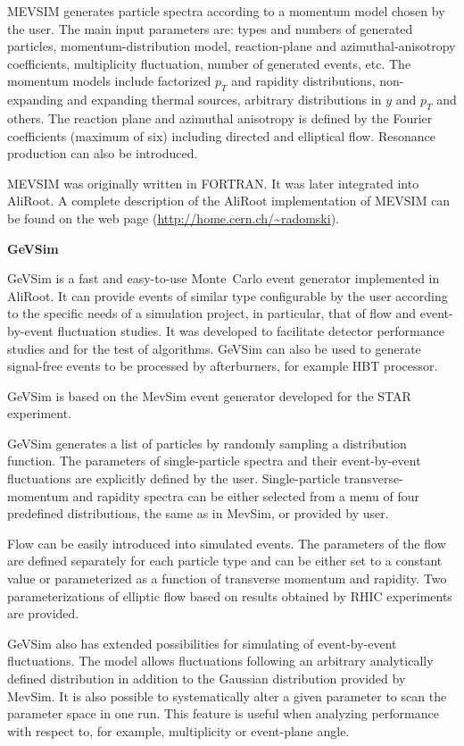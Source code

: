 \documentclass[12pt,a4paper,twoside]{article}
\makeatletter
\newcommand {\MC} {Monte~Carlo\@\xspace}
\makeatother
\begin{document}
MEVSIM generates particle spectra according to a momentum model
chosen by the user. The main input parameters are: types and
numbers of generated particles, momentum-distribution model,
reaction-plane and azimuthal-anisotropy coefficients, multiplicity
fluctuation, number of generated events, etc. The momentum models
include factorized $p_T$ and rapidity distributions, non-expanding
and expanding thermal sources, arbitrary distributions in $y$ and
$p_T$ and others. The reaction plane and azimuthal anisotropy is
defined by the Fourier coefficients (maximum of six) including
directed and elliptical flow. Resonance production can also be
introduced.

MEVSIM was originally written in FORTRAN. It was later integrated into
AliRoot. A complete description of the AliRoot implementation of MEVSIM can
be found on the web page (\url{http://home.cern.ch/~radomski}).

\textbf{GeVSim}

GeVSim \cite{MC:GEVSIM} is a fast and easy-to-use \MC
event generator implemented in AliRoot. It can provide events of
similar type configurable by the user according to the specific
needs of a simulation project, in particular, that of flow and
event-by-event fluctuation studies. It was developed to facilitate
detector performance studies and for the test of algorithms.
GeVSim can also be used to generate signal-free events to be
processed by afterburners, for example HBT processor.

GeVSim is based on the MevSim \cite{MC:MEVSIM} event generator
developed for the STAR experiment. 

GeVSim generates a list of particles by randomly sampling a
distribution function.  The parameters of single-particle spectra
and their event-by-event fluctuations are explicitly defined by
the user. Single-particle transverse-momentum and rapidity spectra
can be either selected from a menu of four predefined
distributions, the same as in MevSim, or provided by user.

Flow can be easily introduced into simulated events. The parameters of
the flow are defined separately for each particle type and can be
either set to a constant value or parameterized as a function of
transverse momentum and rapidity. Two parameterizations of elliptic
flow based on results obtained by RHIC experiments are provided.

GeVSim also has extended possibilities for simulating of
event-by-event fluctuations.  The model allows fluctuations
following an arbitrary analytically defined distribution in
addition to the Gaussian distribution provided by MevSim. It is
also possible to systematically alter a given parameter to scan
the parameter space in one run. This feature is useful when
analyzing performance with respect to, for example, multiplicity
or event-plane angle.
\end{document}
